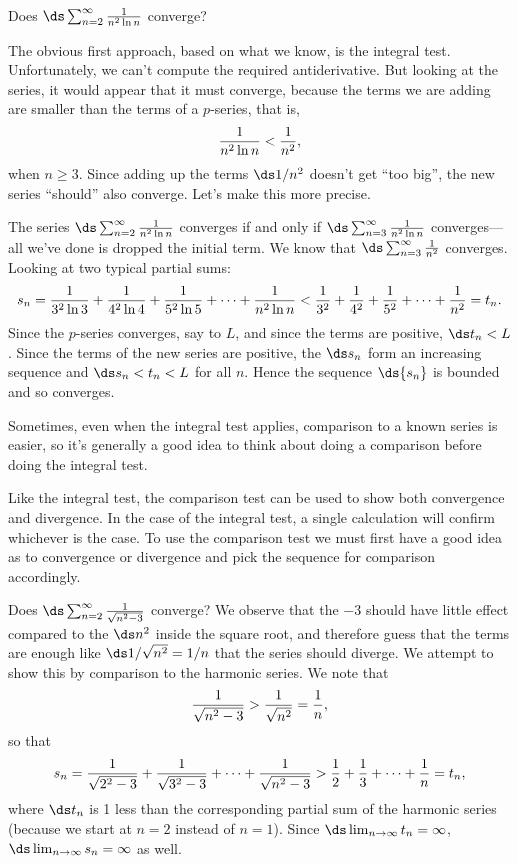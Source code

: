 
\begin{example} Does $\ds\sum_{n=2}^\infty {1\over n^2\ln n}$ converge?
\end{example}

\begin{solution}
The obvious first approach, based on what we know, is the integral test.
Unfortunately, we can't compute the required antiderivative. But
looking at the series, it would appear that it must converge, because
the terms we are adding are smaller than the terms of a $p$-series,
that is,
$${1\over n^2\ln n}<{1\over n^2},$$
when $n\ge3$. Since adding up the terms $\ds 1/n^2$ doesn't get ``too
big'', the new series ``should'' also converge. Let's make this more
precise.

The series $\ds\sum_{n=2}^\infty {1\over n^2\ln n}$ converges if and
only if $\ds\sum_{n=3}^\infty {1\over n^2\ln n}$ converges---all we've
done is dropped the initial term. We know that 
$\ds\sum_{n=3}^\infty {1\over n^2}$ converges. Looking at two typical
partial sums:
$$
  s_n={1\over 3^2\ln 3}+{1\over 4^2\ln 4}+{1\over 5^2\ln 5}+\cdots+
  {1\over n^2\ln n} < {1\over 3^2}+{1\over 4^2}+
  {1\over 5^2}+\cdots+{1\over n^2}=t_n.
$$
Since the $p$-series converges, say to $L$, and since the terms are positive,
$\ds t_n<L$. Since the terms of the new series are positive, the $\ds s_n$
form an increasing sequence and $\ds s_n<t_n<L$ for all $n$. Hence the
sequence $\ds \{s_n\}$ is bounded and so converges.
\end{solution}

Sometimes, even when the integral test applies, comparison to a known
series is easier, so it's generally a good idea to think about doing a
comparison before doing the integral test.

Like the integral test, the comparison test can be used to show both
convergence and divergence. In the case of the integral test, a single
calculation will confirm whichever is the case. To use the comparison
test we must first have a good idea as to convergence or divergence
and pick the sequence for comparison accordingly.

\begin{example} Does $\ds\sum_{n=2}^\infty {1\over\sqrt{n^2-3}}$ converge?
\ssk
We observe that the $-3$ should have little effect compared to the
$\ds n^2$ inside the square root, and therefore guess that the terms are
enough like $\ds 1/\sqrt{n^2}=1/n$ that the series should diverge. We
attempt to show this by comparison to the harmonic series. We note
that 
$${1\over\sqrt{n^2-3}} > {1\over\sqrt{n^2}} = {1\over n},$$
so that
$$
  s_n={1\over\sqrt{2^2-3}}+{1\over\sqrt{3^2-3}}+\cdots+
  {1\over\sqrt{n^2-3}} > {1\over 2} + {1\over3}+\cdots+{1\over n}=t_n,
$$
where $\ds t_n$ is 1 less than the corresponding partial sum of the
harmonic series (because we start at $n=2$ instead of $n=1$). Since
$\ds\lim_{n\to\infty}t_n=\infty$, $\ds\lim_{n\to\infty}s_n=\infty$ as
well.
\end{example}

